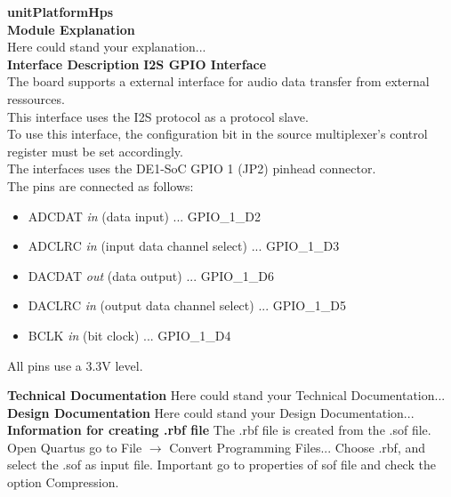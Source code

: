 \documentclass[../../../../doc/ASP-SoC_doc/main.tex]{subfiles}
\begin{document}
\textbf{unitPlatformHps}
\\

\textbf{Module Explanation}
\\
	Here could stand your explanation...\\
\textbf{Interface Description}
\textbf{I2S GPIO Interface}
\\
	The board supports a external interface for audio data transfer from external ressources. \\
	This interface uses the I2S protocol as a protocol slave.\\
	To use this interface, the configuration bit in the source multiplexer's control register must be set accordingly.\\
	The interfaces uses the DE1-SoC GPIO 1 (JP2) pinhead connector. \\
	The pins are connected as follows:
	\begin{itemize}
		\item ADCDAT \textit{in} (data input) ... GPIO\_1\_D2
		\item ADCLRC \textit{in} (input data channel select) ... GPIO\_1\_D3
		\item DACDAT \textit{out} (data output) ... GPIO\_1\_D6
		\item DACLRC \textit{in} (output data channel select) ... GPIO\_1\_D5
		\item BCLK   \textit{in} (bit clock) ... GPIO\_1\_D4
	\end{itemize}
	All pins use a 3.3V level.

\textbf{Technical Documentation}
	Here could stand your Technical Documentation...\\

\textbf{Design Documentation}
	Here could stand your Design Documentation...\\
	
\textbf{Information for creating .rbf file}
	The .rbf file is created from the .sof file. Open Quartus go to File $\rightarrow$ Convert Programming Files... Choose .rbf, and select the .sof as input file. Important go to properties of sof file and check the option Compression.
\end{document}
